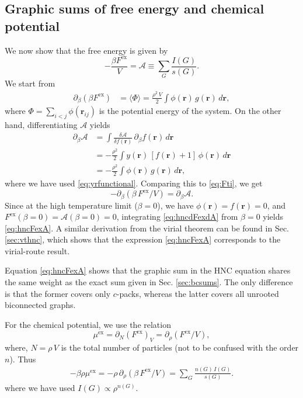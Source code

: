 \documentclass[preprint]{revtex4-1}
\newcommand{\vct}[1]{\mathbf{#1}}
\providecommand{\vr}{} %
\renewcommand{\vr}{\vct{r}}
\newcommand{\supex}[1]{ { { #1 }^{ \mathrm{ex} } } }
\newcommand{\Fex}{\supex{F}}
\newcommand{\muex}{\supex{\mu}}
\newcommand{\A}{\mathcal{A}}
\begin{document}
\subsection{\label{sec:hncFex}Graphic sums of free energy and chemical potential}


We now show that the free energy is given by\cite{morita1958, *morita1959, *morita1960}
\begin{equation}
  -\frac{ \beta \Fex }{V}
=
  \A \equiv \sum_G \frac{ I(G) }{ s(G) }.
\label{eq:hncFexA}
\end{equation}
%
We start from
\begin{align}
  \partial_\beta (\beta \Fex)
&=
 \langle \Phi \rangle
=
\frac{\rho^2 \, V}{2} \int
  \phi(\vr) \, g(\vr) \, d\vr,
  \label{eq:Fti}
\end{align}
where $\Phi = \sum_{i < j} \phi(\vr_{ij})$
is the potential energy of the system.
%
On the other hand, differentiating $\A$ yields
\begin{align*}
  \partial_\beta \A
&=
  \int
  \frac{ \delta \A } { \delta f(\vr) }
  \,
  \partial_\beta f(\vr) \, d\vr
  \\
&=
  -\frac{\rho^2} {2}
  \int
  y(\vr) \, [f(\vr) + 1]
  \, \phi(\vr) \, d\vr
  \\
&=
  -\frac{\rho^2} {2}
  \int \phi(\vr) \, g(\vr) \, d\vr,
\end{align*}
where we have used \eqref{eq:yrfunctional}.
%
Comparing this to \eqref{eq:Fti}, we get
\begin{equation}
  -\partial_\beta(\beta \, \Fex/V) = \partial_\beta \A.
  \label{eq:hncdFexdA}
\end{equation}
Since at the high temperature limit ($\beta = 0$),
we have $\phi(\vr) = f(\vr) = 0$,
and $\Fex(\beta = 0) = \A(\beta = 0) = 0$,
%
integrating \eqref{eq:hncdFexdA} from $\beta = 0$
yields \eqref{eq:hncFexA}.
%
A similar derivation from the virial theorem
can be found in Sec. \ref{sec:vthnc},
which shows that the expression \eqref{eq:hncFexA}
corresponds to the virial-route result.

Equation \eqref{eq:hncFexA} shows that the graphic sum
in the HNC equation shares the same weight as
the exact sum given in Sec. \ref{sec:bcsums}.
%
The only difference is that the former covers only $c$-packs,
whereas the latter covers all unrooted biconnected graphs.


For the chemical potential, we use the relation
\begin{equation}
  \muex = \partial_N(\Fex)_V = \partial_\rho(\Fex/V),
  \label{eq:muexdFex}
\end{equation}
where,
$N = \rho \, V$
is the total number of particles
(not to be confused with the order $n$).
%
Thus
%
\begin{align}
    - \beta \rho \muex
  =
  -\rho \, \partial_\rho(\beta \, \Fex/V)
  =
    \sum_G \frac{ n(G) \, I(G) } { s(G) }.
\label{eq:hncmugsum}
\end{align}
where we have used $I(G) \propto \rho^{n(G)}$.
\end{document}
